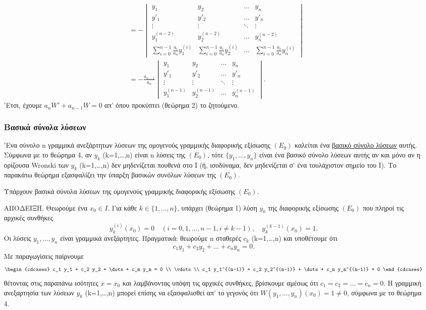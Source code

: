 \documentclass[11pt,a4paper,twoside]{book}
\newcommand{\titlefont}[1]{{\fontfamily{maksf}\selectfont #1}}
\newcounter{thewrhma}[chapter]
\renewcommand{\thethewrhma}{\thechapter.\arabic{thewrhma}}
\newcommand{\thewr}{\refstepcounter{thewrhma}{\bf\titlefont{\textcolor{secondarycolor}{\large Θεώρημα\hspace{2mm}\thethewrhma}}}\hspace{1mm}}{}
\newenvironment{Thewrhma}[1]
{\begin{tcolorbox}[title=\thewr\ \ :\ \  {\textcolor{black}{\bf{\large\titlefont{#1}}}},
breakable,
enhanced standard,
titlerule=-.2pt,
toprule=0pt, 
rightrule=0pt, 
bottomrule=0pt,
colback=white,
left=2mm,
top=1mm,
bottom=0mm,
boxrule=0pt,
colframe=white,
borderline west={1.5mm}{0pt}{secondarycolor},
leftrule=2mm,
sharp corners,
coltitle=secondarycolor]}
{\end{tcolorbox}}
\begin{document}
\begin{align*}
&= -
\begin{vmatrix}
y_1 & y_2 & \dots & y_n \\
y'_1 & y'_2 & \dots & y'_n \\
\vdots & \vdots & \ddots & \vdots \\
y_1^{(n-2)} & y_2^{(n-2)} & \dots & y_n^{(n-2)} \\
\sum_{i=0}^{n-1} \frac{a_i}{a_n} y_1^{(i)} & \sum_{i=0}^{n-1} \frac{a_i}{a_n} y_2^{(i)} & \dots & \sum_{i=0}^{n-1} \frac{a_i}{a_n} y_n^{(i)}
\end{vmatrix}
\\
&= - \frac{a_{n-1}}{a_n}
\begin{vmatrix}
y_1 & y_2 & \dots & y_n \\
y'_1 & y'_2 & \dots & y'_n \\
\vdots & \vdots & \ddots & \vdots \\
y_1^{(n-1)} & y_2^{(n-1)} & \dots & y_n^{(n-1)}
\end{vmatrix}.
\end{align*}
'Ετσι, έχουμε $a_n W' + a_{n-1} W = 0$ απ' όπου προκύπτει (θεώρημα 2) το ζητούμενο.

\subsubsection{Βασικά σύνολα λύσεων}

'Ενα σύνολο n γραμμικά ανεξάρτητων λύσεων της ομογενούς γραμμικής διαφορικής εξίσωσης $(E_0)$ καλείται ένα \underline{βασικό σύνολο λύσεων} αυτής. Σύμφωνα με το θεώρημα 4, αν $y_k$ (k=1,\dots,n) είναι n λύσεις της $(E_0)$, τότε $\{y_1, \dots, y_n\}$ είναι ένα βασικό σύνολο λύσεων αυτής αν και μόνο αν η ορίζουσα Wronski των $y_k$ (k=1,\dots,n) δεν μηδενίζεται πουθενά στο Ι (ή, ισοδύναμα, δεν μηδενίζεται σ' ένα τουλάχιστον σημείο του Ι). Το παρακάτω θεώρημα εξασφαλίζει την ύπαρξη βασικών συνόλων λύσεων της $(E_0)$.

\begin{Thewrhma}{6}
Υπάρχουν βασικά σύνολα λύσεων της ομογενούς γραμμικής διαφορικής εξίσωσης $(E_0)$.
\end{Thewrhma}

\textsc{ΑΠΟΔΕΙΞΗ.} Θεωρούμε ένα $x_0 \in I$. Για κάθε $k \in \{1, \dots, n\}$, υπάρχει (θεώρημα 1) λύση $y_k$ της διαφορικής εξίσωσης $(E_0)$ που πληροί τις αρχικές συνθήκες
\[
y_k^{(i)}(x_0) = 0 \quad (i=0,1,\dots,n-1, i \ne k-1), \quad y_k^{(k-1)}(x_0) = 1.
\]
Οι λύσεις $y_1, \dots, y_n$ είναι γραμμικά ανεξάρτητες. Πραγματικά: θεωρούμε n σταθερές $c_k$ (k=1,\dots,n) και υποθέτουμε ότι
\[
c_1 y_1 + c_2 y_2 + \dots + c_n y_n = 0.
\]
Με παραγωγίσεις παίρνουμε
\[
\begin{cdcases}
c_1 y_1 + c_2 y_2 + \dots + c_n y_n = 0 \\
\vdots \\
c_1 y_1^{(n-1)} + c_2 y_2^{(n-1)} + \dots + c_n y_n^{(n-1)} = 0
\end{cdcases}
\]
θέτοντας στις παραπάνω ισότητες $x=x_0$ και λαμβάνοντας υπόψη τις αρχικές συνθήκες, βρίσκουμε αμέσως ότι $c_1=c_2=\dots=c_n=0$. Η γραμμική ανεξαρτησία των λύσεων $y_k$ (k=1,\dots,n) μπορεί επίσης να εξασφαλισθεί απ' το γεγονός ότι $W(y_1,\dots,y_n)(x_0) = 1 \ne 0$, σύμφωνα με το θεώρημα 4.
\end{document}
